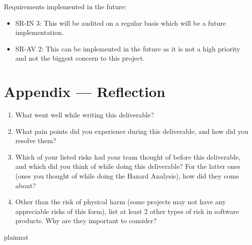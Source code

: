 \documentclass{article}
\begin{document}
Requirements implemented in the future:
\begin{itemize}
    \item SR-IN 3: This will be audited on a regular basis which will be a future implementation.
    \item SR-AV 2: This can be implemented in the future as it is not a high priority and not the biggest concern to this project.

\end{itemize}

\newpage{}

\section*{Appendix --- Reflection}




\begin{enumerate}
    \item What went well while writing this deliverable? 
    \item What pain points did you experience during this deliverable, and how
    did you resolve them?
    \item Which of your listed risks had your team thought of before this
    deliverable, and which did you think of while doing this deliverable? For
    the latter ones (ones you thought of while doing the Hazard Analysis), how
    did they come about?
    \item Other than the risk of physical harm (some projects may not have any
    appreciable risks of this form), list at least 2 other types of risk in
    software products. Why are they important to consider?
\end{enumerate}

 {plainnat}

\end{document}
